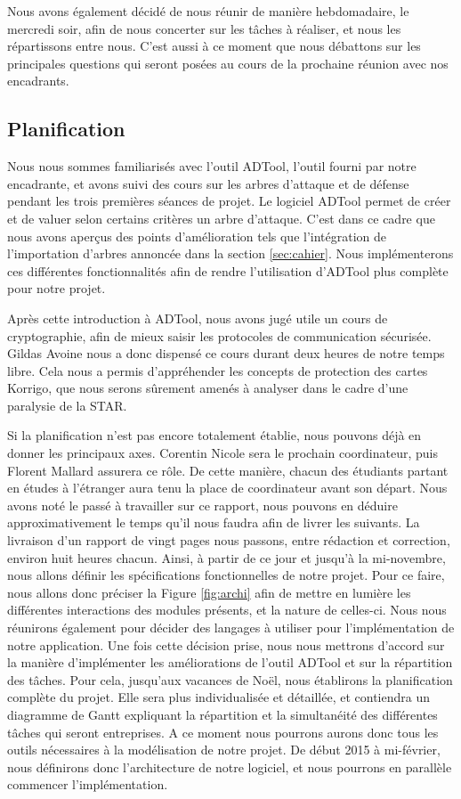 	    Nous avons également décidé de nous réunir de manière hebdomadaire, le mercredi soir, afin de nous concerter sur les tâches à réaliser, et nous les répartissons entre nous. C'est aussi à ce moment que nous débattons sur les principales questions qui seront posées au cours de la prochaine réunion avec nos encadrants.

	    
				\subsection{Planification}
		Nous nous sommes familiarisés avec l'outil ADTool, l'outil fourni par notre encadrante, et avons suivi des cours sur les arbres d'attaque et de défense pendant les trois premières séances de projet. Le logiciel ADTool permet de créer et de valuer selon certains critères un arbre d'attaque. C'est dans ce cadre que nous avons aperçus des points d'amélioration tels que l'intégration de l'importation d'arbres annoncée dans la section \ref{sec:cahier}. Nous implémenterons ces différentes fonctionnalités afin de rendre l'utilisation d'ADTool plus complète pour notre projet.
	    
	    Après cette introduction à ADTool, nous avons jugé utile un cours de cryptographie, afin de mieux saisir les protocoles de communication sécurisée. Gildas Avoine nous a donc dispensé ce cours durant deux heures de notre temps libre. Cela nous a permis d'appréhender les concepts de protection des cartes Korrigo, que nous serons sûrement amenés à analyser dans le cadre d'une paralysie de la STAR.
			
		Si la planification n'est pas encore totalement établie, nous pouvons déjà en donner les principaux axes.
		Corentin Nicole sera le prochain coordinateur, puis Florent Mallard assurera ce rôle. De cette manière, chacun des étudiants partant en études à l'étranger aura tenu la place de coordinateur avant son départ.
		Nous avons noté le passé à travailler sur ce rapport, nous pouvons en déduire approximativement le temps qu'il nous faudra afin de livrer les suivants. La livraison d'un rapport de vingt pages nous passons, entre rédaction et correction, environ huit heures chacun.
		Ainsi, à partir de ce jour et jusqu'à la mi-novembre, nous allons définir les spécifications fonctionnelles de notre projet.
		Pour ce faire, nous allons donc préciser la Figure \ref{fig:archi} afin de mettre en lumière les différentes interactions des modules présents, et la nature de celles-ci. Nous nous réunirons également pour décider des langages à utiliser pour l'implémentation de notre application.
		Une fois cette décision prise, nous nous mettrons d'accord sur la manière d'implémenter les améliorations de l'outil ADTool et sur la répartition des tâches.
		Pour cela, jusqu'aux vacances de Noël, nous établirons la planification complète du projet. Elle sera plus individualisée et détaillée, et contiendra un diagramme de Gantt expliquant la répartition et la simultanéité des différentes tâches qui seront entreprises.
		A ce moment nous pourrons aurons donc tous les outils nécessaires à la modélisation de notre projet.
		De début 2015 à mi-février, nous définirons donc l'architecture de notre logiciel, et nous pourrons en parallèle commencer l'implémentation.

	    

